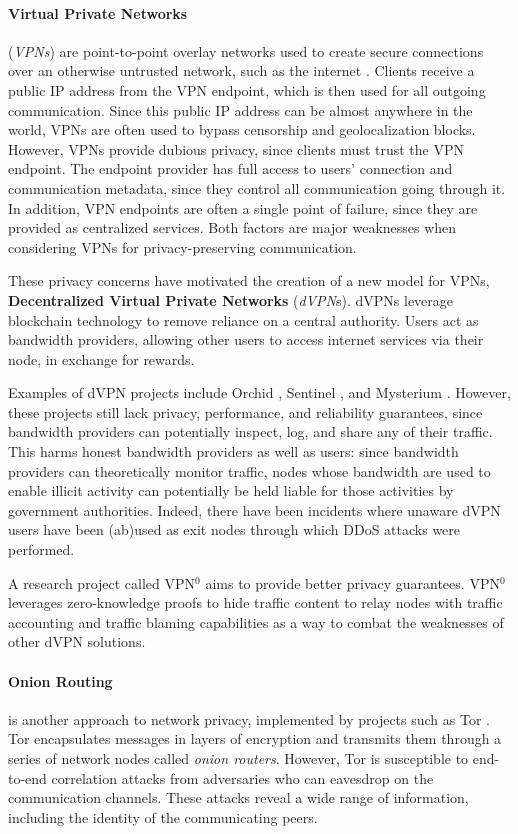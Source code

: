 \paragraph{Virtual Private Networks}(\textit{VPNs}) are point-to-point overlay networks used to create secure connections over an otherwise untrusted network, such as the internet \cite{venkateswaran_2001}. Clients receive a public IP address from the VPN endpoint, which is then used for all outgoing communication. Since this public IP address can be almost anywhere in the world, VPNs are often used to bypass censorship \cite{hobbs_roberts_2018} and geolocalization blocks. However, VPNs provide dubious privacy, since clients must trust the VPN endpoint. The endpoint provider has full access to users' connection and communication metadata, since they control all communication going through it. In addition, VPN endpoints are often a single point of failure, since they are provided as centralized services. Both factors are major weaknesses when considering VPNs for privacy-preserving communication.

These privacy concerns have motivated the creation of a new model for VPNs, \textbf{Decentralized Virtual Private Networks} (\textit{dVPN}s). dVPNs leverage blockchain technology to remove reliance on a central authority. Users act as bandwidth providers, allowing other users to access internet services via their node, in exchange for rewards.

Examples of dVPN projects include Orchid \cite{orchid}, Sentinel \cite{sentinel}, and Mysterium \cite{mysterium}. However, these projects still lack privacy, performance, and reliability guarantees, since bandwidth providers can potentially inspect, log, and share any of their traffic. This harms honest bandwidth providers as well as users: since bandwidth providers can theoretically monitor traffic, nodes whose bandwidth are used to enable illicit activity can potentially be held liable for those activities by government authorities. Indeed, there have been incidents where unaware dVPN users have been (ab)used as exit nodes through which DDoS attacks
were performed.

A research project called VPN$^0$ \cite{vpn0} aims to provide better privacy guarantees. VPN$^0$ leverages zero-knowledge proofs to hide traffic content to relay nodes with traffic accounting and traffic blaming capabilities as a way to combat the weaknesses of other dVPN solutions.

\paragraph{Onion Routing} is another approach to network privacy, implemented by projects such as Tor \cite{tor}. Tor encapsulates messages in layers of encryption and transmits them through a series of network nodes called \textit{onion routers}. However, Tor is susceptible to end-to-end correlation attacks from adversaries who can eavesdrop on the communication channels. These attacks reveal a wide range of information, including the identity of the communicating peers.

